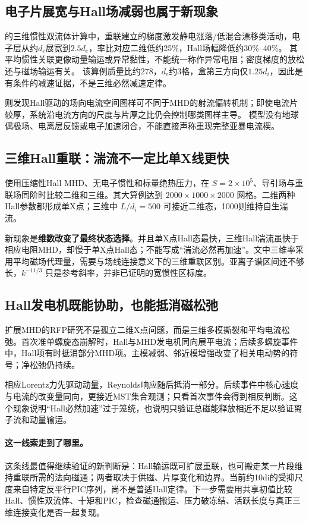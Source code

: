 \documentclass[UTF8,a4paper,11pt,openany,fontset=fandol]{ctexbook}
\begin{document}
\subsection{电子片展宽与Hall场减弱也属于新现象}
\citet{L020}的三维惯性双流体计算中，重联建立的梯度激发静电涨落/低混合漂移类活动，电子层从约$d_e$展宽到$2.5d_e$，率比对应二维低约25\%，Hall场幅降低约30\%--40\%。
其平均惯性关联更像动量输运或异常黏性，不能统一称作异常电阻；密度梯度的放松还与磁场输运有关。
该算例质量比约278，$d_e$约3格，盒第三方向仅$1.25d_i$，因此是有条件的减速证据，不是三维必然减速定律。

\citet{L204}则发现Hall驱动的场向电流空间图样可不同于MHD的射流偏转机制；即使电流片较厚，系统沿电流方向的尺度与片厚之比仍会控制哪类图样主导。
模型没有地球偶极场、电离层反馈或电子加速闭合，不能直接声称重现完整亚暴电流楔。

\subsection{三维Hall重联：湍流不一定比单X线更快}
\citet{Huang2024}使用压缩性Hall MHD、无电子惯性和标量绝热压力，在 $S=2\times10^5$、导引场与重联场同阶时比较二维和三维。其大算例达到 $2000\times1000\times2000$ 网格。二维两种Hall参数都形成单X点；三维中 $L/d_i=500$ 可接近二维态，1000则维持自生湍流。

新现象是\textbf{维数改变了最终状态选择}。并且单X点Hall态最快，三维Hall湍流虽快于相应电阻MHD，却慢于单X点Hall态；不能写成“湍流必然再加速”。文中三维率采用平均磁场代理量，需要与场线连接意义下的三维重联区别。亚离子谱区间还不够长，$k^{-11/3}$ 只是参考斜率，并非已证明的宽惯性区标度。

\subsection{Hall发电机既能协助，也能抵消磁松弛}
扩展MHD的RFP研究\citep{F798}不是孤立二维X点问题，而是三维多模撕裂和平均电流松弛。首次准单螺旋态崩解时，Hall与MHD发电机同向展平电流；后续多螺旋事件中，Hall项有时抵消部分MHD项。主模减弱、邻近模增强改变了相关电动势的符号；净松弛仍持续。

相应Lorentz力先驱动动量，Reynolds响应随后抵消一部分。后续事件中核心速度与电流的改变量同向，更接近MST集合观测；只看首次事件会得到相反判断。这个现象说明“Hall必然加速”过于笼统，也说明只验证总磁能释放相近不足以验证离子流和动量输运。

\paragraph{这一线索走到了哪里。}这条线最值得继续验证的新判断是：Hall输运既可扩展重联，也可搬走某一片段维持重联所需的法向磁通；两者取决于供磁、片厚变化和边界。当前约10di的受抑尺度来自特定反平行PIC序列，尚不是普适Hall定律。下一步需要用共享初值比较Hall、惯性双流体、十矩和PIC，检查磁通搬运、压力破冻结、活跃长度与真正三维连接变化是否一起复现。
\end{document}
